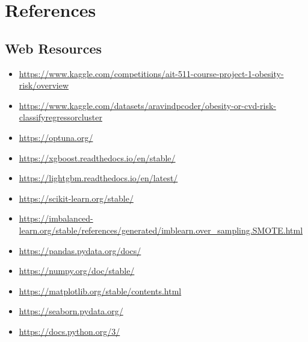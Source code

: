 \documentclass[12pt,a4paper]{report}
\begin{document}
    {
        \chapter*{References}
        \printbibliography

        \vspace{1em}
        \section*{Web Resources}

        \begin{itemize}
            \item \url{https://www.kaggle.com/competitions/ait-511-course-project-1-obesity-risk/overview}
            \item \url{https://www.kaggle.com/datasets/aravindpcoder/obesity-or-cvd-risk-classifyregressorcluster}
            \item \url{https://optuna.org/}
            \item \url{https://xgboost.readthedocs.io/en/stable/}
            \item \url{https://lightgbm.readthedocs.io/en/latest/}
            \item \url{https://scikit-learn.org/stable/}
            \item \url{https://imbalanced-learn.org/stable/references/generated/imblearn.over_sampling.SMOTE.html}
            \item \url{https://pandas.pydata.org/docs/}
            \item \url{https://numpy.org/doc/stable/}
            \item \url{https://matplotlib.org/stable/contents.html}
            \item \url{https://seaborn.pydata.org/}
            \item \url{https://docs.python.org/3/}
        \end{itemize}
    }
\end{document}
